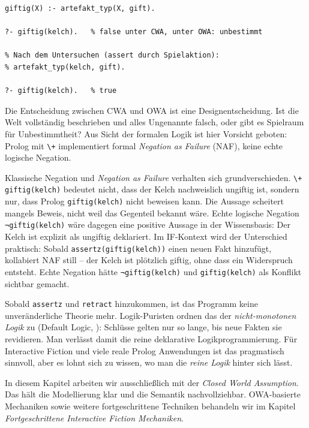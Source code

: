 \documentclass[parskip=half,a4paper,11pt]{scrreprt}
\begin{document}
\begin{lstlisting}[caption={}]
% Vor dem Untersuchen: kein artefakt_typ in der Wissensbasis
giftig(X) :- artefakt_typ(X, gift).

?- giftig(kelch).   % false unter CWA, unter OWA: unbestimmt

% Nach dem Untersuchen (assert durch Spielaktion):
% artefakt_typ(kelch, gift).

?- giftig(kelch).   % true
\end{lstlisting}

Die Entscheidung zwischen CWA und OWA ist eine Designentscheidung. Ist die Welt vollständig beschrieben und alles Ungenannte falsch, oder gibt es Spielraum für Unbestimmtheit? Aus Sicht der formalen Logik ist hier Vorsicht geboten:  Prolog mit \texttt{\textbackslash+} implementiert formal 
\textit{Negation as Failure} (NAF), keine echte logische Negation.

Klassische Negation und \textit{Negation as Failure} verhalten sich grundverschieden. \texttt{\textbackslash+ giftig(kelch)} bedeutet nicht, dass der Kelch nachweislich ungiftig ist, sondern nur, dass Prolog \texttt{giftig(kelch)} nicht beweisen kann. Die Aussage scheitert mangels Beweis, nicht weil das Gegenteil bekannt wäre. Echte logische Negation \texttt{¬giftig(kelch)} wäre dagegen eine positive Aussage in der Wissensbasis: Der Kelch ist explizit als ungiftig deklariert. Im IF-Kontext wird der Unterschied praktisch: Sobald \texttt{assertz(giftig(kelch))} einen neuen Fakt hinzufügt, kollabiert NAF still – der Kelch ist plötzlich giftig, ohne dass ein Widerspruch entsteht. Echte Negation hätte \texttt{¬giftig(kelch)} und \texttt{giftig(kelch)} als Konflikt sichtbar gemacht.

Sobald \texttt{assertz} und \texttt{retract} hinzukommen, ist das Programm keine unveränderliche Theorie mehr. Logik-Puristen ordnen das der \textit{nicht-monotonen Logik} zu (Default Logic, \citealt{Reiter1980}): Schlüsse gelten nur so lange, bis neue Fakten sie revidieren. Man verlässt damit die reine deklarative Logikprogrammierung. Für Interactive Fiction und viele reale Prolog Anwendungen ist das pragmatisch sinnvoll, aber es lohnt sich zu wissen, wo man die \textit{reine Logik} hinter sich lässt.

In diesem Kapitel arbeiten wir ausschließlich mit der \textit{Closed World Assumption}. Das hält die Modellierung klar und die Semantik nachvollziehbar. OWA-basierte Mechaniken sowie weitere fortgeschrittene Techniken behandeln wir im Kapitel \textit{Fortgeschrittene Interactive Fiction Mechaniken}.
\end{document}
